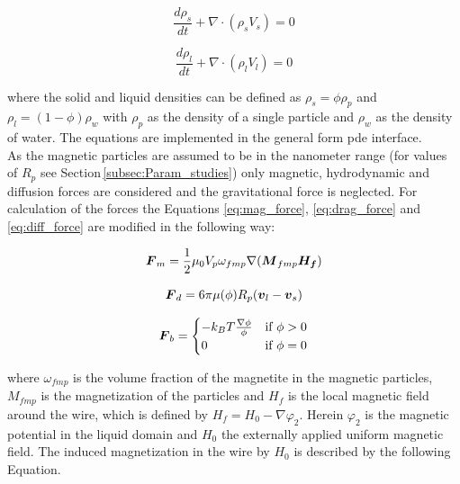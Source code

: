\begin{equation}
\frac{d\rho_{s}}{d t}+\nabla\cdotp(\rho_{s}V_{s})=0
\label{eq:Conti_p}
\end{equation}

\begin{equation}
\frac{d\rho_{l}}{d t}+\nabla\cdotp(\rho_{l}V_{l})=0
\label{eq:Conti_l}
\end{equation}

where the solid and liquid densities can be defined as $\rho_{s}=\phi\rho_{p}$ and $\rho_{l}=(1-\phi)\rho_{w}$ with $\rho_{p}$ as the density of a single particle and $\rho_{w}$ as the density of water. The equations are implemented in the general form \gls{pde} interface.\\
As the magnetic particles are assumed to be in the nanometer range (for values of $R_{p}$ see Section\,\ref{subsec:Param_studies}) only magnetic, hydrodynamic and diffusion forces are considered and the gravitational force is neglected. For calculation of the forces the Equations \ref{eq:mag_force}, \ref{eq:drag_force} and \ref{eq:diff_force} are modified in the following way:  

\begin{equation}
\label{eq:mag_force_model}
\centering
\boldsymbol{F}_{m} = \frac{1}{2}\mu_{0}V_{p}\omega_{fmp}\nabla(\boldsymbol{M}_{fmp}\boldsymbol{H_{f}})
\end{equation}

\begin{equation}
\label{eq:drag_force_model}
\centering
\boldsymbol{F}_{d} = 6\pi\mu(\phi)R_{p}(\boldsymbol{v}_{l}-\boldsymbol{v}_{s})
\end{equation}

\begin{equation}
\label{eq:diff_force_model}
\centering
\boldsymbol{F}_{b}= 
                 \begin{cases}
                    -k_{B}T\frac{\nabla\phi}{\phi} & \text{if}\ \phi>0 \\
                    0 & \text{if}\ \phi=0
                 \end{cases}
\end{equation}

where $\omega_{fmp}$ is the volume fraction of the magnetite in the magnetic particles, $M_{fmp}$ is the magnetization of the particles and $H_{f}$ is the local magnetic field around the wire, which is defined by $H_{f}=H_{0}-\nabla\varphi_{2}$. Herein $\varphi_{2}$ is the magnetic potential in the liquid domain and $H_{0}$ the externally applied uniform magnetic field. The induced magnetization in the wire  by $H_{0}$ is described by the following Equation.


